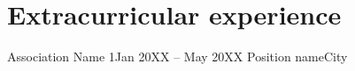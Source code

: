 \section{Extracurricular 
 experience}
\resumeSubHeadingListStart

    \resumeSubheading
    {Association Name 1}{Jan 20XX -- May 20XX}
    {Position name}{City}
    \resumeItemListStart
    \resumeItemListEnd


\resumeSubHeadingListEnd
